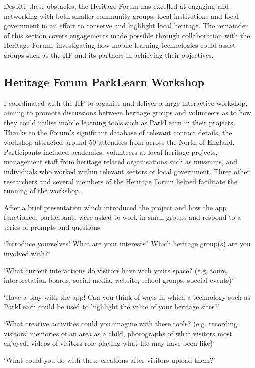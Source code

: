 Despite these obstacles, the Heritage Forum has excelled at engaging and networking with both smaller community groups, local institutions and local government in an effort to conserve and highlight local heritage. The remainder of this section covers engagements made possible through collaboration with the Heritage Forum, investigating how mobile learning technologies could assist groups such as the HF and its partners in achieving their objectives.

\subsection{Heritage Forum ParkLearn Workshop}
\label{sec:HeritageParkLearnWorkshop}
I coordinated with the HF to organise and deliver a large interactive workshop, aiming to promote discussions between heritage groups and volunteers as to how they could utilise mobile learning tools such as ParkLearn in their projects. Thanks to the Forum's significant database of relevant contact details, the workshop attracted around 50 attendees from across the North of England. Participants included academics, volunteers at local heritage projects, management staff from heritage related organisations such as museums, and individuals who worked within relevant sectors of local government. Three other researchers and several members of the Heritage Forum helped facilitate the running of the workshop.

After a brief presentation which introduced the project and how the app functioned, participants were asked to work in small groups and respond to a series of prompts and questions: 

\begin{displayquote}
`Introduce yourselves! What are your interests? Which heritage group(s) are you involved with?'

`What current interactions do visitors have with yours space? (e.g. tours, interpretation boards, social media, website, school groups, special events)'

`Have a play with the app! Can you think of ways in which a technology such as ParkLearn could be used to highlight the value of your heritage sites?'

`What creative activities could you imagine with these tools? (e.g. recording visitors' memories of an area as a child, photographs of what visitors most enjoyed, videos of visitors role-playing what life may have been like)'

`What could you do with these creations after visitors upload them?'
\end{displayquote}

